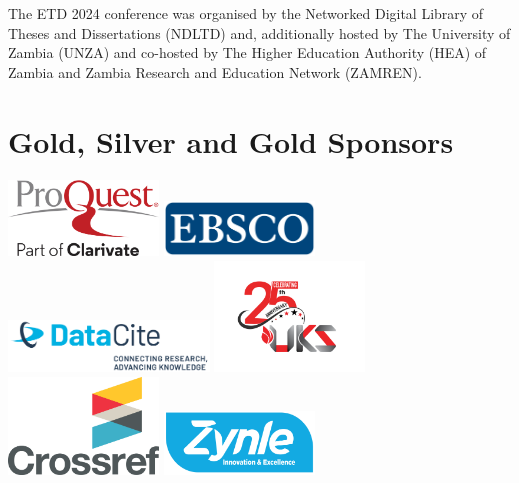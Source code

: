\begin{center}
The ETD 2024 conference was organised by the Networked Digital Library of Theses and Dissertations (NDLTD) and, additionally hosted by The University of Zambia (UNZA) and co-hosted by The Higher Education Authority (HEA) of Zambia and Zambia Research and Education Network (ZAMREN).
\end{center}

\section{Gold, Silver and Gold Sponsors}

\begin{center}
\includegraphics[width=0.30\textwidth]{images/logos/Partnerlogos/img-etd24-artwork-sponsors-proquest.png}
\includegraphics[width=0.30\textwidth]{images/logos/Partnerlogos/img-etd24-artwork-sponsors-ebsco.png}
\includegraphics[width=0.40\textwidth]{images/logos/Partnerlogos/img-etd24-artwork-sponsors-datacite.png}
\includegraphics[width=0.30\textwidth]{images/logos/Partnerlogos/img-etd24-artwork-sponsors-uks.png}
\includegraphics[width=0.30\textwidth]{images/logos/Partnerlogos/img-etd24-artwork-sponsors-crossref.jpg}
\includegraphics[width=0.30\textwidth]{images/logos/Partnerlogos/img-etd24-artwork-sponsors-zynle.png}
\end{center}


